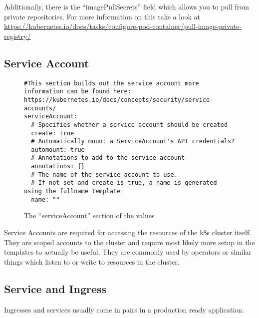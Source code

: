 Additionally, there is the \enquote{imagePullSecrets} field which allows you to pull from private repositories. For more information on this take a look at \url{https://kubernetes.io/docs/tasks/configure-pod-container/pull-image-private-registry/}


\subsection{Service Account}

\begin{figure}[h]
\begin{verbatim}
#This section builds out the service account more information can be found here: https://kubernetes.io/docs/concepts/security/service-accounts/
serviceAccount:
  # Specifies whether a service account should be created
  create: true
  # Automatically mount a ServiceAccount's API credentials?
  automount: true
  # Annotations to add to the service account
  annotations: {}
  # The name of the service account to use.
  # If not set and create is true, a name is generated using the fullname template
  name: ""
\end{verbatim}
\caption{The \enquote{serviceAccount} section of the \gls{values}}\label{code:service_account_section}
\end{figure}

Service Accounts are required for accessing the resources of the \gls{k8s} cluster itself.
They are scoped accounts to the cluster and require most likely more setup in the templates to actually be useful.
They are commonly used by operators or similar things which listen to or write to resources in the cluster.

\subsection{Service and Ingress}

Ingresses and services usually come in pairs in a production ready application.

